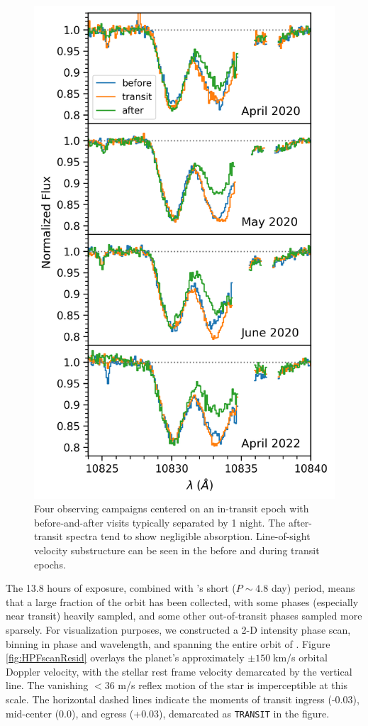 \documentclass[twocolumn]{aastex631}
\begin{document}
\begin{figure}
    \includegraphics[width=\linewidth]{figures/HAT_P_67b_byCampaign_Spectra.png}
    \caption{Four observing campaigns centered on an in-transit epoch with before-and-after visits typically separated by 1 night. The after-transit spectra tend to show negligible absorption.  Line-of-sight velocity substructure can be seen in the before and during transit epochs.}
    \label{fig:HPFperCampaign}
\end{figure}


The 13.8 hours of exposure, combined with 's short ($P\sim4.8$ day) period, means that a large fraction of the orbit has been collected, with some phases (especially near transit) heavily sampled, and some other out-of-transit phases sampled more sparsely. For visualization purposes, we constructed a 2-D intensity phase scan, binning in phase and wavelength, and spanning the entire orbit of .  Figure \ref{fig:HPFscanResid} overlays the planet's approximately $\pm150\;$km/s orbital Doppler velocity, with the stellar rest frame velocity demarcated by the vertical line.  The vanishing $<36$ m/s reflex motion of the star is imperceptible at this scale.  The horizontal dashed lines indicate the moments of transit ingress (-0.03), mid-center (0.0), and egress (+0.03), demarcated as \texttt{TRANSIT} in the figure.
\end{document}
